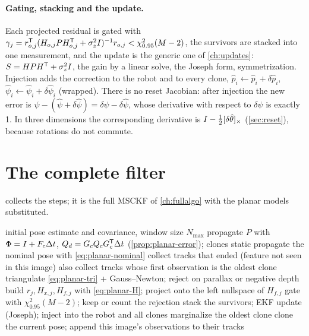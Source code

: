 \paragraph{Gating, stacking and the update.} Each projected residual is gated with $\gamma_j = r_{o,j}^{\mathsf{T}}(H_{o,j}PH_{o,j}^{\mathsf{T}} + \sigma_z^2I)^{-1} r_{o,j}
< \chi^2_{0.95}(M - 2)$, the survivors are stacked into one measurement, and the update is the generic one of \cref{ch:updates}: $S = HPH^{\mathsf{T}} + \sigma_z^2I$, the
gain by a linear solve, the Joseph form, symmetrization. Injection adds the correction to the robot and to every clone,
$\hat p_i \gets \hat p_i + \delta\hat p_i$, $\hat\psi_i \gets \hat\psi_i + \delta\hat\psi_i$ (wrapped). There is no reset Jacobian: after injection the new error is
$\psi - (\hat\psi + \delta\hat\psi) = \delta\psi - \delta\hat\psi$, whose derivative with respect to $\delta\psi$ is exactly 1. In three dimensions the corresponding
derivative is $I - \tfrac12[\delta\hat\theta]_{\times}$ (\cref{sec:reset}), because rotations do not commute.

\section{The complete filter}

 collects the steps; it is the full MSCKF of \cref{ch:fullalgo} with the planar models substituted.

\begin{algorithm}[t]
\caption{Planar MSCKF}
\label{alg:planar-msckf}
\begin{algorithmic}[1]
\Require initial pose estimate and covariance, window size $N_{\max}$
  \State propagate $P$ with $\Phi = I + F_c{\Delta t}$, $Q_d = G_cQ_cG_c^{\mathsf{T}}{\Delta t}$ (\cref{prop:planar-error}); clones static
  \State propagate the nominal pose with \eqref{eq:planar-nominal}
    \State collect tracks that ended (feature not seen in this image)
     also collect tracks whose first observation is the oldest clone \EndIf
      \State triangulate \eqref{eq:planar-tri} + Gauss--Newton; reject on parallax or negative depth
      \State build $r_j, H_{x,j}, H_{f,j}$ with \eqref{eq:planar-H}; project onto the left nullspace of $H_{f,j}$
      \State gate with $\chi^2_{0.95}(M - 2)$; keep or count the rejection
    \EndFor
    \State stack the survivors; EKF update (Joseph); inject into the robot and all clones
     marginalize the oldest clone \EndIf
    \State clone the current pose; append this image's observations to their tracks
  \EndIf
\EndFor
\end{algorithmic}
\end{algorithm}

